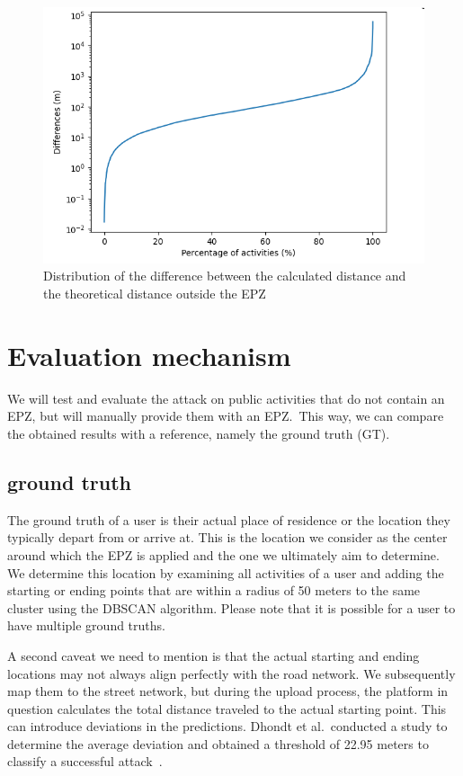 \documentclass[conference]{IEEEtran}
\begin{document}
\begin{figure}[h]
    \centering
    \includegraphics[width=\linewidth]{fig/Afwijkingen&Analyses/Graphs/100_Differences_tov_theoretische_BefSmoothening.png}
    \caption{Distribution of the difference between the calculated distance and the theoretical distance outside the EPZ}\label{fig:differences_log}
\end{figure}

\section{\textbf{Evaluation mechanism}}
We will test and evaluate the attack on public activities that do not contain
an EPZ, but will manually provide them with an EPZ.\ This way, we can compare
the obtained results with a reference, namely the ground truth (GT).

\subsection{ground truth}
The ground truth of a user is their actual place of residence or the location
they typically depart from or arrive at. This is the location we consider as
the center around which the EPZ is applied and the one we ultimately aim to
determine. We determine this location by examining all activities of a user and
adding the starting or ending points that are within a radius of 50 meters to
the same cluster using the DBSCAN algorithm. Please note that it is possible
for a user to have multiple ground truths.

A second caveat we need to mention is that the actual starting and ending
locations may not always align perfectly with the road network. We subsequently
map them to the street network, but during the upload process, the platform in
question calculates the total distance traveled to the actual starting point.
This can introduce deviations in the predictions. Dhondt et al.\ conducted a
study to determine the average deviation and obtained a threshold of 22.95
meters to classify a successful attack~\cite{Dhondt}.
\end{document}
